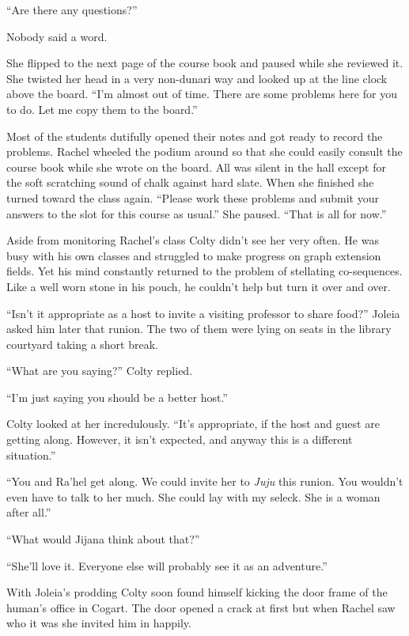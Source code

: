 ``Are there any questions?''

Nobody said a word.

She flipped to the next page of the course book and paused while she reviewed it. She twisted
her head in a very non-dunari way and looked up at the line clock above the board. ``I'm almost
out of time. There are some problems here for you to do. Let me copy them to the board.''

Most of the students dutifully opened their notes and got ready to record the problems. Rachel
wheeled the podium around so that she could easily consult the course book while she wrote on
the board. All was silent in the hall except for the soft scratching sound of chalk against hard
slate. When she finished she turned toward the class again. ``Please work these problems and
submit your answers to the slot for this course as usual.'' She paused. ``That is all for now.''

Aside from monitoring Rachel's class Colty didn't see her very often. He was busy with his own
classes and struggled to make progress on graph extension fields. Yet his mind constantly
returned to the problem of stellating co-sequences. Like a well worn stone in his pouch, he
couldn't help but turn it over and over.

``Isn't it appropriate as a host to invite a visiting professor to share food?'' Joleia asked
him later that runion. The two of them were lying on seats in the library courtyard taking a
short break.

``What are you saying?'' Colty replied.

``I'm just saying you should be a better host.''

Colty looked at her incredulously. ``It's appropriate, if the host and guest are getting along.
However, it isn't expected, and anyway this is a different situation.''

``You and Ra'hel get along. We could invite her to \textit{Juju} this runion. You wouldn't even
have to talk to her much. She could lay with my seleck. She is a woman after all.''

``What would Jijana think about that?''

``She'll love it. Everyone else will probably see it as an adventure.''

With Joleia's prodding Colty soon found himself kicking the door frame of the human's office in
Cogart. The door opened a crack at first but when Rachel saw who it was she invited him in
happily.

